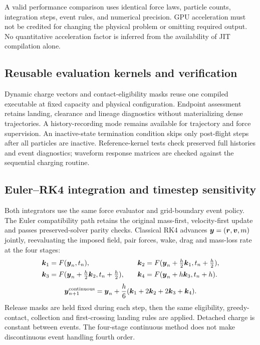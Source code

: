 A valid performance comparison uses identical force laws, particle counts, integration steps, event rules, and numerical precision. GPU acceleration must not be credited for changing the physical problem or omitting required output. No quantitative acceleration factor is inferred from the availability of JIT compilation alone.

\subsection{Reusable evaluation kernels and verification}
Dynamic charge vectors and contact-eligibility masks reuse one compiled executable at fixed capacity and physical configuration. Endpoint assessment retains landing, clearance and lineage diagnostics without materializing dense trajectories. A history-recording mode remains available for trajectory and force supervision. An inactive-state termination condition skips only post-flight steps after all particles are inactive. Reference-kernel tests check preserved full histories and event diagnostics; waveform response matrices are checked against the sequential charging routine.

\subsection{Euler--RK4 integration and timestep sensitivity}\label{sec:integration_comparison}
Both integrators use the same force evaluator and grid-boundary event policy. The Euler compatibility path retains the original mass-first, velocity-first update and passes preserved-solver parity checks. Classical RK4 advances $\boldsymbol{y}=(\boldsymbol{r},\boldsymbol{v},m)$ jointly, reevaluating the imposed field, pair forces, wake, drag and mass-loss rate at the four stages:
\begin{equation}
 \begin{aligned}
 \boldsymbol{k}_1&=F(\boldsymbol{y}_n,t_n), &\quad \boldsymbol{k}_2&=F(\boldsymbol{y}_n+\tfrac h2\boldsymbol{k}_1,t_n+\tfrac h2),\\
 \boldsymbol{k}_3&=F(\boldsymbol{y}_n+\tfrac h2\boldsymbol{k}_2,t_n+\tfrac h2), &\quad \boldsymbol{k}_4&=F(\boldsymbol{y}_n+h\boldsymbol{k}_3,t_n+h).
 \end{aligned}
\end{equation}
\begin{equation}
 \boldsymbol{y}_{n+1}^{\rm continuous}=\boldsymbol{y}_n+\frac h6(\boldsymbol{k}_1+2\boldsymbol{k}_2+2\boldsymbol{k}_3+\boldsymbol{k}_4).
\end{equation}
Release masks are held fixed during each step, then the same eligibility, greedy-contact, collection and first-crossing landing rules are applied. Detached charge is constant between events. The four-stage continuous method does not make discontinuous event handling fourth order.

